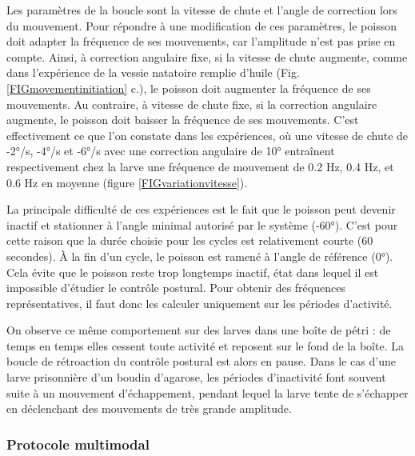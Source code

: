 Les paramètres de la boucle sont la vitesse de chute et l'angle de correction lors du mouvement. Pour répondre à une modification de ces paramètres, le poisson doit adapter la fréquence de ses mouvements, car l'amplitude n'est pas prise en compte. Ainsi, à correction angulaire fixe, si la vitesse de chute augmente, comme dans l'expérience de la vessie natatoire remplie d'huile (Fig. \ref{FIGmovementinitiation} c.), le poisson doit augmenter la fréquence de ses mouvements. Au contraire, à vitesse de chute fixe, si la correction angulaire augmente, le poisson doit baisser la fréquence de ses mouvements. C'est effectivement ce que l'on constate dans les expériences, où une vitesse de chute de -2°/s, -4°/s et -6°/s avec une correction angulaire de 10° entraînent respectivement chez la larve une fréquence de mouvement de 0.2 Hz, 0.4 Hz, et 0.6 Hz en moyenne (figure \ref{FIGvariationvitesse}).


La principale difficulté de ces expériences est le fait que le poisson peut devenir inactif et stationner à l'angle minimal autorisé par le système (-60°). C'est pour cette raison que la durée choisie pour les cycles est relativement courte (60 secondes). À la fin d'un cycle, le poisson est ramené à l'angle de référence (0°). Cela évite que le poisson reste trop longtemps inactif, état dans lequel il est impossible d'étudier le contrôle postural. Pour obtenir des fréquences représentatives, il faut donc les calculer uniquement sur les périodes d'activité.

On observe ce même comportement sur des larves dans une boîte de pétri : de temps en temps elles cessent toute activité et reposent sur le fond de la boîte. La boucle de rétroaction du contrôle postural est alors en pause. Dans le cas d'une larve prisonnière d'un boudin d'agarose, les périodes d'inactivité font souvent suite à un mouvement d'échappement, pendant lequel la larve tente de s'échapper en déclenchant des mouvements de très grande amplitude.

\subsubsection{Protocole multimodal}

